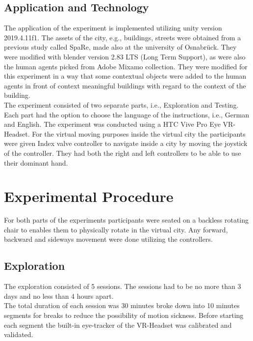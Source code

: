 
\subsection{Application and Technology}

The application of the experiment is implemented utilizing unity version 2019.4.11f1. The assets of the city, e.g., buildings, streets were obtained from a previous study called SpaRe, made also at the university of Osnabrück. They were modified with blender version 2.83 LTS (Long Term Support), as were also the human agents picked from Adobe Mixamo collection. They were modified for this experiment in a way that some contextual objects were added to the human agents in front of context meaningful buildings with regard to the context of the building. \\
The experiment consisted of two separate parts, i.e., Exploration and Testing.  Each part had the option to choose the language of the instructions, i.e., German and English. The experiment was conducted using a HTC Vive Pro Eye VR-Headset. For the virtual moving purposes inside the virtual city the participants were given Index valve controller to navigate inside a city by moving the joystick of the controller. They had both the right and left controllers to be able to use their dominant hand.

\section{Experimental Procedure}

For both parts of the experiments participants were seated on a backless rotating chair to enables them to physically rotate in the virtual city. Any forward, backward and sideways movement were done utilizing the controllers.

\subsection{Exploration}

The exploration consisted of 5 sessions. The sessions had to be no more than 3 days and no less than 4 hours apart. \\
The total duration of each session was 30 minutes broke down into 10 minutes segments for breaks to reduce the possibility of motion sickness. Before starting each segment the built-in eye-tracker of the VR-Headset was calibrated and validated. \\

